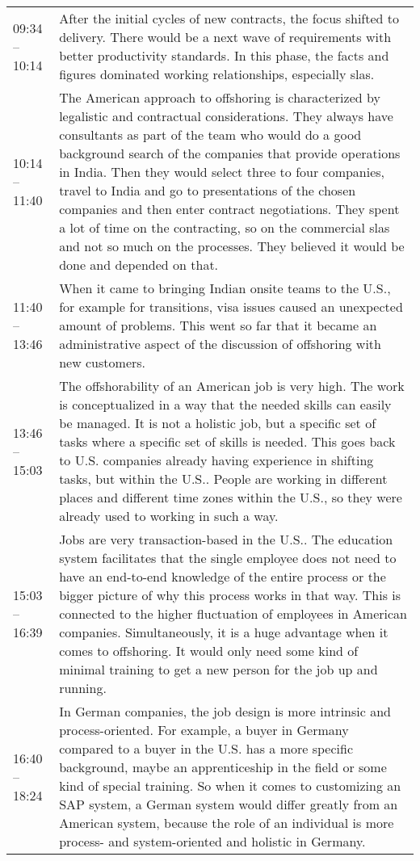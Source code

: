 \begin{appendix}
\begin{longtable}{l p{12.5cm}}
	09:34 -- 10:14& After the initial cycles of new contracts, the focus shifted to delivery. There would be a next wave of requirements with better productivity standards. In this phase, the facts and figures dominated working relationships, especially \glspl{sla}.\\
	10:14 -- 11:40&The American approach to offshoring is characterized by legalistic and contractual considerations. They always have consultants as part of the team who would do a good background search of the companies that provide operations in India. Then they would select three to four companies, travel to India and go to presentations of the chosen companies and then enter contract negotiations. They spent a lot of time on the contracting, so on the commercial \glspl{sla} and not so much on the processes. They believed it would be done and depended on that.\\
	11:40 -- 13:46&When it came to bringing Indian onsite teams to the U.S., for example for transitions, visa issues caused an unexpected amount of problems. This went so far that it became an administrative aspect of the discussion of offshoring with new customers.\\
	13:46 -- 15:03& The offshorability of an American job is very high. The work is conceptualized in a way that the needed skills can easily be managed. It is not a holistic job, but a specific set of tasks where a specific set of skills is needed. This goes back to U.S. companies already having experience in shifting tasks, but within the U.S.. People are working in different places and different time zones within the U.S., so they were already used to working in such a way.\\
	15:03 -- 16:39 & Jobs are very transaction-based in the U.S.. The education system facilitates that the single employee does not need to have an end-to-end knowledge of the entire process or the bigger picture of why this process works in that way. This is connected to the higher fluctuation of employees in American companies. Simultaneously, it is a huge advantage when it comes to offshoring. It would only need some kind of minimal training to get a new person for the job up and running.\\
	16:40 -- 18:24 & In German companies, the job design is more intrinsic and process-oriented. For example, a buyer in Germany compared to a buyer in the U.S. has a more specific background, maybe an apprenticeship in the field or some kind of special training. So when it comes to customizing an SAP system, a German system would differ greatly from an American system, because the role of an individual is more process- and system-oriented and holistic in Germany.\\

\end{longtable}
\end{appendix}
